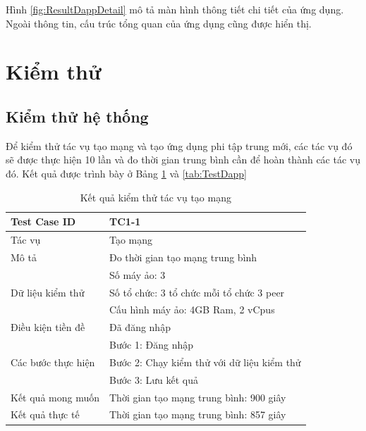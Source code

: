 \documentclass[../DoAn.tex]{subfiles}
\begin{document}
Hình \ref{fig:ResultDappDetail} mô tả màn hình thông tiết chi tiết của ứng
dụng. Ngoài thông tin, cấu trúc tổng quan của ứng dụng cũng được hiển thị.

\section{Kiểm thử}

\subsection{Kiểm thử hệ thống}

Để kiểm thử tác vụ tạo mạng và tạo ứng dụng phi tập trung mới, các tác vụ đó sẽ được thực hiện 10 lần và đo thời gian trung bình cần để hoàn thành các tác vụ đó. Kết quả được trình bày ở Bảng \ref{tab:TestNetwork} và \ref{tab:TestDapp}

\begingroup
\renewcommand{\arraystretch}{1.5} %
\begin{table}[H]
    \centering
    \def\arraystretch{1.5}
    \caption{Kết quả kiểm thử tác vụ tạo mạng}
    \label{tab:TestNetwork}
    \begin{tabular}{|p{}|p{}|}
        \hline
        Test Case ID                                       & TC1-1                                      \\ \hline
        Tác vụ                                             & Tạo mạng                                   \\ \hline
        Mô tả                                              & Đo thời gian tạo mạng trung bình           \\ \hline
        \multirow[t]{3}{0.3\textwidth}{Dữ liệu kiểm thử}   & Số máy ảo: 3                               \\
                                                           & Số tổ chức: 3 tổ chức mỗi tổ chức 3 peer   \\
                                                           & Cấu hình máy ảo: 4GB Ram, 2 vCpus          \\ \hline
        Điều kiện tiền đề                                  & Đã đăng nhập                               \\ \hline
        \multirow[t]{3}{0.3\textwidth}{Các bước thực hiện} & Bước 1: Đăng nhập                          \\
                                                           & Bước 2: Chạy kiểm thử với dữ liệu kiểm thử \\
                                                           & Bước 3: Lưu kết quả                        \\ \hline
        Kết quả mong muốn                                  & Thời gian tạo mạng trung bình: 900 giây    \\ \hline
        Kết quả thực tế                                    & Thời gian tạo mạng trung bình: 857 giây    \\ \hline
    \end{tabular}
\end{table}
\endgroup
\end{document}
